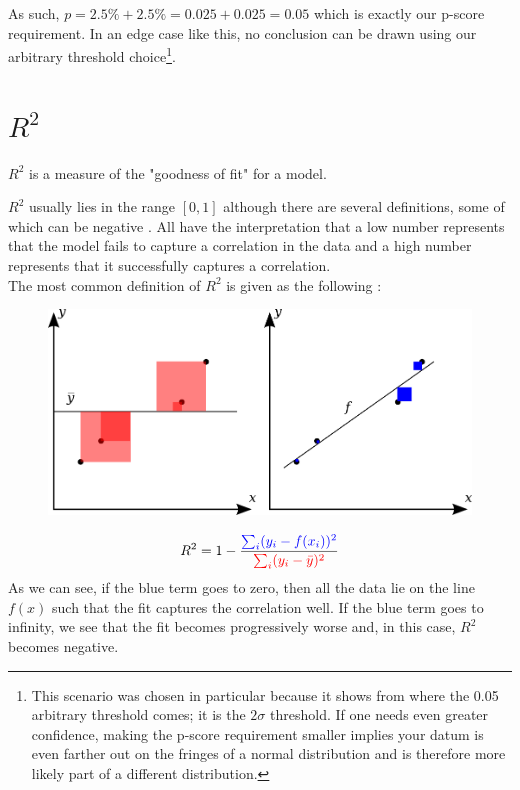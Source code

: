 \documentclass[]{article}
\begin{document}
As such, $p = 2.5\% + 2.5\% = 0.025 + 0.025 = 0.05$ which is exactly our p-score requirement. In an edge case like this, no conclusion can be drawn using our arbitrary threshold choice\footnote{This scenario was chosen in particular because it shows from where the 0.05 arbitrary threshold comes; it is the $2\sigma$ threshold. If one needs even greater confidence, making the p-score requirement smaller implies your datum is even farther out on the fringes of a normal distribution and is therefore more likely part of a different distribution.}.

\section{$R^2$}
\label{section_R-sq}
$R^2$ is a measure of the "goodness of fit" for a model.

$R^2$ usually lies in the range $[0, 1]$ although there are several definitions, some of which can be negative \cite{r2}. All have the interpretation that a low number represents that the model fails to capture a correlation in the data and a high number represents that it successfully captures a correlation.\\

The most common definition of $R^2$ is given as the following \cite{correlation_coefficient}:
\begin{figure}[H]
	\begin{center}
		\includegraphics[width=\columnwidth]{./figures/CoD.png}
	\end{center}
\end{figure}
\begin{equation*}
	R^2 = 1 - \frac{\color{blue}{\sum_i (y_i - f(x_i))^2}}{\color{red}{\sum_i (y_i - \bar{y})^2}}
\end{equation*}
As we can see, if the blue term goes to zero, then all the data lie on the line $f(x)$ such that the fit captures the correlation well.
If the blue term goes to infinity, we see that the fit becomes progressively worse and, in this case, $R^2$ becomes negative.
\end{document}
